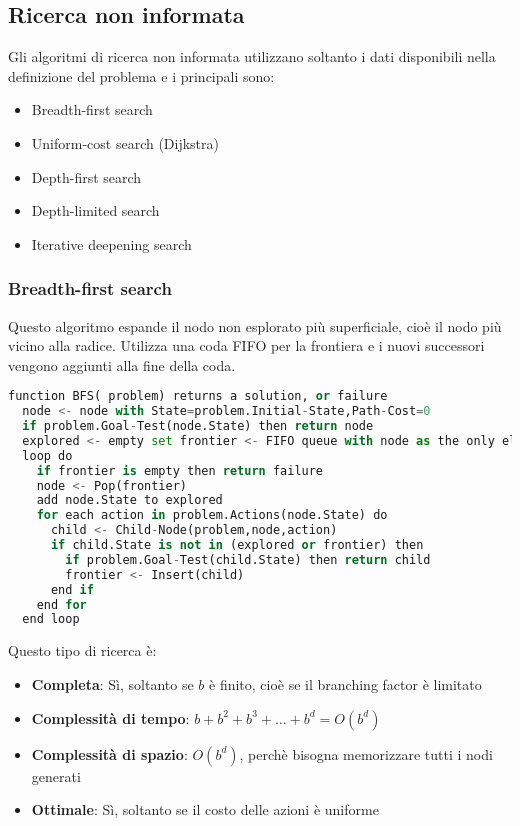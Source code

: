 \documentclass[a4paper]{article}
\begin{document}
\subsection{Ricerca non informata}
Gli algoritmi di ricerca non informata utilizzano soltanto i dati disponibili nella
definizione del problema e i principali sono:
\begin{itemize}
  \item Breadth-first search
  \item Uniform-cost search (Dijkstra)
  \item Depth-first search
  \item Depth-limited search
  \item Iterative deepening search
\end{itemize}

\subsubsection{Breadth-first search}
Questo algoritmo espande il nodo non esplorato più superficiale, cioè il nodo più vicino
alla radice. Utilizza una coda FIFO per la frontiera e i nuovi successori vengono
aggiunti alla fine della coda.
\begin{lstlisting}[language=Python]
function BFS( problem) returns a solution, or failure
  node <- node with State=problem.Initial-State,Path-Cost=0
  if problem.Goal-Test(node.State) then return node
  explored <- empty set frontier <- FIFO queue with node as the only element
  loop do
    if frontier is empty then return failure
    node <- Pop(frontier)
    add node.State to explored
    for each action in problem.Actions(node.State) do
      child <- Child-Node(problem,node,action)
      if child.State is not in (explored or frontier) then
        if problem.Goal-Test(child.State) then return child
        frontier <- Insert(child)
      end if
    end for
  end loop
\end{lstlisting}
\noindent
Questo tipo di ricerca è:
\begin{itemize}
  \item \textbf{Completa}: Sì, soltanto se \( b \) è finito, cioè se il branching factor
    è limitato
  \item \textbf{Complessità di tempo}: \( b + b^2 + b^3 + \ldots + b^d = O(b^d) \)
  \item \textbf{Complessità di spazio}: \( O(b^d) \), perchè bisogna memorizzare tutti i nodi
    generati
  \item \textbf{Ottimale}: Sì, soltanto se il costo delle azioni è uniforme
\end{itemize}
\end{document}
